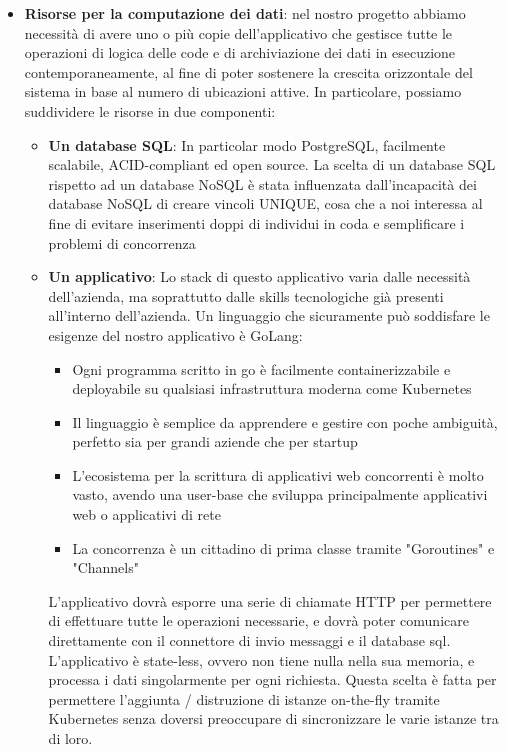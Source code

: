 \documentclass[a4paper, titlepage, 12pt, openright, twoside]{book}
\begin{document}
\begin{itemize}
	\item \textbf{Risorse per la computazione dei dati}: nel nostro progetto abbiamo necessità di avere uno o più copie dell'applicativo che gestisce tutte le operazioni
				 di logica delle code e di archiviazione dei dati in esecuzione contemporaneamente, al fine di poter sostenere la crescita orizzontale del sistema in base al numero di ubicazioni attive. In particolare, possiamo suddividere le risorse in due componenti:
				 \begin{itemize}
				 	\item \textbf{Un database SQL}: In particolar modo PostgreSQL, facilmente scalabile, ACID-compliant ed open source. La scelta di un database SQL rispetto ad
				 				 un database NoSQL è stata influenzata dall'incapacità dei database NoSQL di creare vincoli UNIQUE, cosa che a noi interessa
				 				 al fine di evitare inserimenti doppi di individui in coda e semplificare i problemi di concorrenza
				 	\item \textbf{Un applicativo}: Lo stack di questo applicativo varia dalle necessità dell'azienda, ma soprattutto dalle skills tecnologiche già presenti
				 				 all'interno dell'azienda. Un linguaggio che sicuramente può soddisfare le esigenze del nostro applicativo è GoLang:
				 				 \begin{itemize}
				 				 	\item Ogni programma scritto in go è facilmente containerizzabile e deployabile su qualsiasi infrastruttura moderna come Kubernetes
				 				 	\item Il linguaggio è semplice da apprendere e gestire con poche ambiguità, perfetto sia per grandi aziende che per startup
				 				 	\item L'ecosistema per la scrittura di applicativi web concorrenti è molto vasto, avendo una user-base che sviluppa principalmente 
				 				 		  applicativi web o applicativi di rete
				 				 	\item La concorrenza è un cittadino di prima classe tramite "Goroutines" e "Channels"
				 				 \end{itemize}
				 				 L'applicativo dovrà esporre una serie di chiamate HTTP per permettere di effettuare tutte le operazioni necessarie,
				 				 e dovrà poter comunicare direttamente con il connettore di invio messaggi e il database sql. L'applicativo è state-less, ovvero non tiene nulla nella sua memoria, e processa i dati singolarmente per ogni richiesta. Questa scelta è fatta per permettere l'aggiunta / distruzione di istanze on-the-fly tramite
				 				 Kubernetes senza doversi preoccupare di sincronizzare le varie istanze tra di loro.
				 \end{itemize}
	

\end{itemize}
\end{document}
